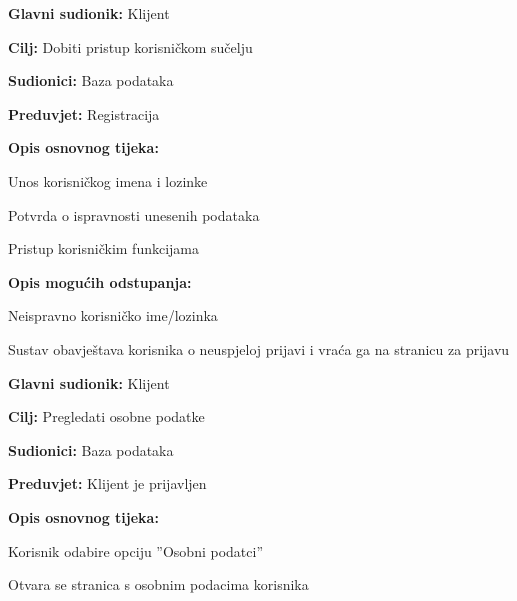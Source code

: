 \noindent {}
\begin{packed_item}
	
	\item \textbf{Glavni sudionik: }Klijent
	\item  \textbf{Cilj:} Dobiti pristup korisničkom sučelju
	\item  \textbf{Sudionici:} Baza podataka
	\item  \textbf{Preduvjet:} Registracija
	\item  \textbf{Opis osnovnog tijeka:}
	
	\item[] \begin{packed_enum}
		
		\item Unos korisničkog imena i lozinke
		\item Potvrda o ispravnosti unesenih podataka
		\item Pristup korisničkim funkcijama
		
	\end{packed_enum}
	
	\item  \textbf{Opis mogućih odstupanja:}
	
	\item[] \begin{packed_item}
		
		\item[2.a] Neispravno korisničko ime/lozinka
		\item[] \begin{packed_enum}
			
			\item Sustav obavještava korisnika o neuspjeloj prijavi i vraća ga na stranicu za prijavu
			
			
		\end{packed_enum}
		
		
	\end{packed_item}	
\end{packed_item}

\noindent {}
\begin{packed_item}
	
	\item \textbf{Glavni sudionik: }Klijent
	\item  \textbf{Cilj:} Pregledati osobne podatke
	\item  \textbf{Sudionici:} Baza podataka
	\item  \textbf{Preduvjet:} Klijent je prijavljen
	\item  \textbf{Opis osnovnog tijeka:}
	
	\item[] \begin{packed_enum}
		
		\item Korisnik odabire opciju ”Osobni podatci”
		\item Otvara se stranica s osobnim podacima korisnika
		
		
	\end{packed_enum}
	
	
\end{packed_item}

